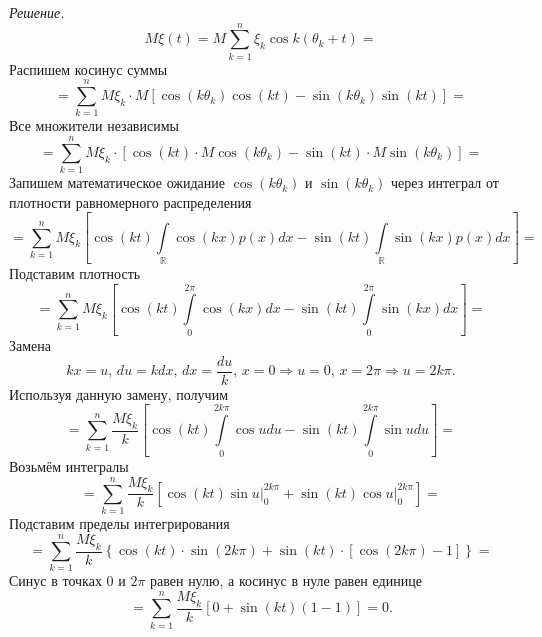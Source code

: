 \textit{Решение.}
$$M \xi \left( t \right) =
  M \sum \limits_{k = 1}^n \xi_k \cos k \left( \theta_k + t \right) =$$
Распишем косинус суммы
$$= \sum \limits_{k = 1}^n
    M \xi_k \cdot
    M \left[
      \cos \left( k \theta_k \right) \cos \left( kt \right) -
      \sin \left( k \theta_k \right) \sin \left( kt \right) \right] =$$
Все множители независимы
$$= \sum \limits_{k = 1}^n
  M \xi_k \cdot
  \left[
    \cos \left( kt \right) \cdot M \cos \left( k \theta_k \right) -
    \sin \left( kt \right) \cdot M \sin \left( k \theta_k \right) \right] =$$
Запишем математическое ожидание $ \cos \left( k \theta_k \right) $ и
$ \sin \left( k \theta_k \right) $ через интеграл от плотности равномерного распределения
$$= \sum \limits_{k = 1}^n
  M \xi_k \left[
    \cos \left( kt \right) \int \limits_{ \mathbb{R}} \cos \left( kx \right) p \left( x \right) dx -
    \sin \left( kt \right) \int \limits_{ \mathbb{R}} \sin \left( kx \right) p \left( x \right) dx
  \right] =$$
Подставим плотность
$$= \sum \limits_{k = 1}^n
  M \xi_k \left[
    \cos \left( kt \right) \int \limits_0^{2 \pi } \cos \left( kx \right) dx -
    \sin \left( kt \right) \int \limits_0^{2 \pi } \sin \left( kx \right) dx \right] =$$
Замена
$$kx = u, \,
  du = kdx, \,
  dx = \frac{du}{k}, \,
  x = 0 \Rightarrow u = 0, \,
  x = 2 \pi \Rightarrow u = 2k \pi.$$
Используя данную замену, получим
$$= \sum \limits_{k = 1}^n
    \frac{M \xi_k}{k} \left[
      \cos \left( kt \right) \int \limits_0^{2k \pi } \cos udu -
      \sin \left( kt \right) \int \limits_0^{2k \pi } \sin udu \right] =$$
Возьмём интегралы
$$= \sum \limits_{k = 1}^n
    \frac{M \xi_k}{k} \left[
      \cos \left( kt \right) \left. \sin u \right|_0^{2k \pi } +
      \sin \left( kt \right) \left. \cos u \right|_0^{2k \pi } \right] =$$
Подставим пределы интегрирования
$$= \sum \limits_{k = 1}^n
    \frac{M \xi_k}{k}
    \left\{
      \cos \left( kt \right) \cdot \sin \left( 2k \pi \right) +
      \sin \left( kt \right) \cdot \left[ \cos \left( 2k \pi \right) - 1 \right] \right\} =$$
Синус в точках 0 и $2 \pi $ равен нулю, а косинус в нуле равен единице
$$= \sum \limits_{k = 1}^n
    \frac{M \xi_k}{k} \left[ 0 + \sin \left( kt \right) \left( 1 - 1 \right) \right] =
  0.$$

